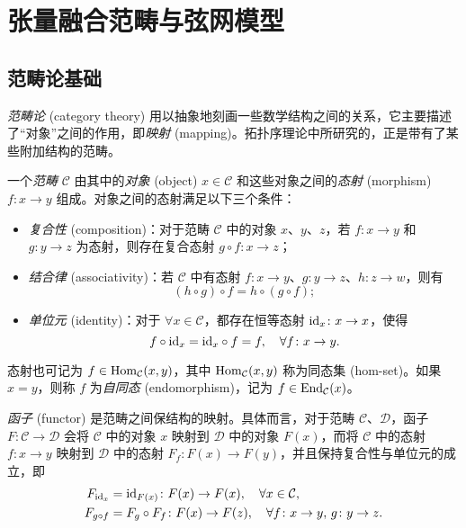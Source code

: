 \chapter{张量融合范畴与弦网模型}

\section{范畴论基础}

\emph{范畴论} (category theory)\cite{baez2011physics,maclane2013categories} 用以抽象地刻画一些数学结构之间的关系，它主要描述了“对象”之间的作用，即\emph{映射} (mapping)。拓扑序理论中所研究的，正是带有了某些附加结构的范畴。

一个\emph{范畴} $\mathcal{C}$ 由其中的\emph{对象} (object) $x\in\mathcal{C}$ 和这些对象之间的\emph{态射} (morphism) $f\colon x\to y$ 组成。对象之间的态射满足以下三个条件：
\begin{itemize}
  \item \emph{复合性} (composition)：对于范畴 $\mathcal{C}$ 中的对象 $x$、$y$、$z$，若 $f\colon x\to y$ 和 $g\colon y\to z$ 为态射，则存在复合态射 $g\circ f\colon x\to z$；
  \item \emph{结合律} (associativity)：若 $\mathcal{C}$ 中有态射 $f\colon x\to y$、$g\colon y\to z$、$h\colon z\to w$，则有
    \begin{equation}
      (h\circ g)\circ f = h\circ (g\circ f);
    \end{equation}
  \item \emph{单位元} (identity)：对于 $\forall x\in\mathcal{C}$，都存在恒等态射 ${\mathrm{id}}_x\colon x\to x$，使得
    \begin{equation}
      f \circ {\mathrm{id}}_x = {\mathrm{id}}_x \circ f = f, \quad \forall f\colon x\to y.
    \end{equation}
\end{itemize}
态射也可记为 $f\in\operatorname{Hom}_{\mathcal{C}}(x,y)$，其中 $\operatorname{Hom}_{\mathcal{C}}(x,y)$ 称为同态集 (hom-set)。如果 $x=y$，则称 $f$ 为\emph{自同态} (endomorphism)，记为 $f\in\operatorname{End}_{\mathcal{C}}(x)$。

\emph{函子} (functor) 是范畴之间保结构的映射。具体而言，对于范畴 $\mathcal{C}$、$\mathcal{D}$，函子 $F\colon\mathcal{C}\to\mathcal{D}$ 会将 $\mathcal{C}$ 中的对象 $x$ 映射到 $\mathcal{D}$ 中的对象 $F(x)$，而将 $\mathcal{C}$ 中的态射 $f\colon x\to y$ 映射到 $\mathcal{D}$ 中的态射 $F_f\colon F(x)\to F(y)$，并且保持复合性与单位元的成立，即
\begin{align}
  F_{{\mathrm{id}}_x} &= {\mathrm{id}}_{F(x)} \colon F(x) \to F(x), \quad \forall x\in\mathcal{C}, \\
  F_{g\circ f} &= F_g \circ F_f \colon F(x) \to F(z), \quad \forall f\colon x\to y, \, g\colon y\to z.
\end{align}

